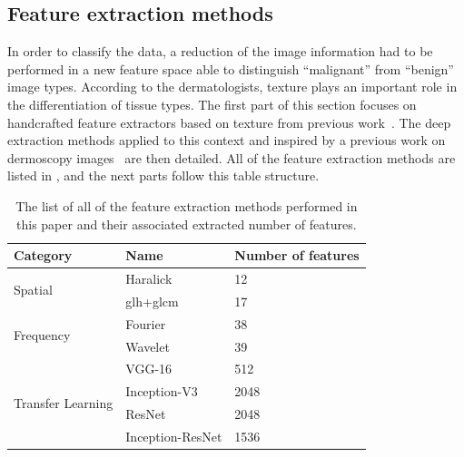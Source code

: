 \documentclass[journal,article,accept,moreauthors,pdftex, applsci]{Definitions/mdpi}
\begin{document}
\subsection{Feature extraction methods}
\label{sec:features}
In order to classify the data, a reduction of the image information had to be performed in a new feature space able to distinguish “malignant” from “benign” image types. According to the dermatologists, texture plays an important role in the differentiation of tissue types. The first part of this section focuses on handcrafted feature extractors based on texture from previous work~\cite{Wiltgen2008}. The deep extraction methods applied to this context and inspired by a previous work on dermoscopy images~\cite{Esteva2017} are then detailed. All of the feature extraction methods are listed in , and the next parts follow this table structure.\par
\begin{table}[H]
    \centering
    \begin{tabular}{lll}
    \hline
    \textbf{Category}                   &  \textbf{Name}                & \textbf{Number of features}  \\ \hline
    \multirow{2}{*}{Spatial}            &  Haralick                     & 12                        \\ \cline{2-3} 
                                        &  \ac{glh}+\ac{glcm}           & 17                        \\ \hline 
    \multirow{2}{*}{Frequency}          &  Fourier                      & 38                        \\ \cline{2-3} 
                                        &  Wavelet                      & 39                        \\ \hline
    \multirow{4}{*}{Transfer Learning}  &  VGG-16                       & 512                       \\ \cline{2-3} 
                                        &  Inception-V3                 & 2048                      \\ \cline{2-3} 
                                        &  ResNet                       & 2048                      \\ \cline{2-3} 
                                        &  Inception-ResNet             & 1536                      \\ \hline
    \end{tabular}
    \caption{The list of all of the feature extraction methods performed in this paper and their associated extracted number of features.}
    \label{tab:features_methods}
\end{table}\par
\end{document}
